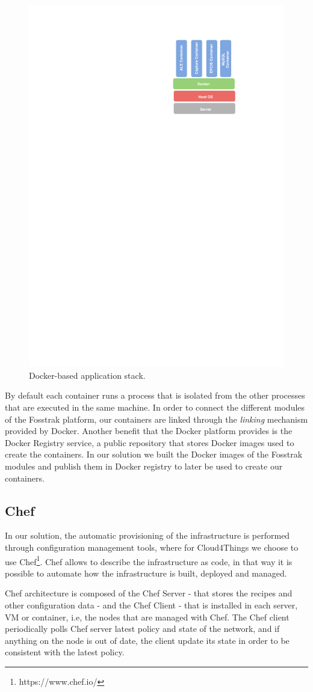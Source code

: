 \begin{figure}[!ht]
  \centering
  \includegraphics[width=.5\textwidth]{images/docker-stack}
  \caption{Docker-based application stack.}
  \label{fig:docker_stack}
\end{figure}

By default each container runs a process that is isolated from the other processes that are executed in
the same machine. In order to connect the different modules of the Fosstrak platform, our containers are
linked through the \textit{linking} mechanism provided by Docker. Another benefit that the Docker platform
provides is the Docker Registry service, a public repository that stores Docker images used to create the
containers. In our solution we built the Docker images of the Fosstrak modules and publish them
in Docker registry to later be used to create our containers.
\subsection{Chef}
\label{sub:chef}
In our solution, the automatic provisioning of the infrastructure is performed through configuration
management tools, where for Cloud4Things we choose to use Chef\footnote{https://www.chef.io/}. Chef
allows to describe the infrastructure as code, in that way it is possible to automate how the
infrastructure is built, deployed and managed.

Chef architecture is composed of the Chef Server - that stores the recipes and other configuration data -
and the  Chef Client - that is installed in each server, VM or container, i.e, the nodes that are managed with Chef.
The Chef client periodically polls Chef server latest policy and state of the network, and if anything on the
node is out of date, the client update its state in order to be consistent with the latest policy.

